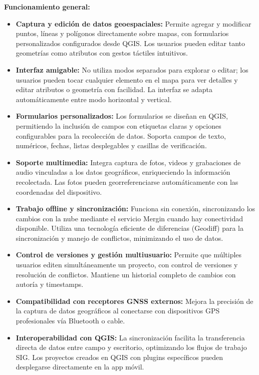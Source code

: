 \documentclass[12pt, a4paper]{book}
\begin{document}
\textbf{Funcionamiento general:}
\begin{itemize}
  \item \textbf{Captura y edición de datos geoespaciales:} Permite agregar y modificar puntos, líneas y polígonos directamente sobre mapas, con formularios personalizados configurados desde QGIS. Los usuarios pueden editar tanto geometrías como atributos con gestos táctiles intuitivos.
  
  \item \textbf{Interfaz amigable:} No utiliza modos separados para explorar o editar; los usuarios pueden tocar cualquier elemento en el mapa para ver detalles y editar atributos o geometría con facilidad. La interfaz se adapta automáticamente entre modo horizontal y vertical.
  
  \item \textbf{Formularios personalizados:} Los formularios se diseñan en QGIS, permitiendo la inclusión de campos con etiquetas claras y opciones configurables para la recolección de datos. Soporta campos de texto, numéricos, fechas, listas desplegables y casillas de verificación.
  
  \item \textbf{Soporte multimedia:} Integra captura de fotos, videos y grabaciones de audio vinculadas a los datos geográficos, enriqueciendo la información recolectada. Las fotos pueden georreferenciarse automáticamente con las coordenadas del dispositivo.
  
  \item \textbf{Trabajo offline y sincronización:} Funciona sin conexión, sincronizando los cambios con la nube mediante el servicio Mergin cuando hay conectividad disponible. Utiliza una tecnología eficiente de diferencias (Geodiff) para la sincronización y manejo de conflictos, minimizando el uso de datos.
  
  \item \textbf{Control de versiones y gestión multiusuario:} Permite que múltiples usuarios editen simultáneamente un proyecto, con control de versiones y resolución de conflictos. Mantiene un historial completo de cambios con autoría y timestamps.
  
  \item \textbf{Compatibilidad con receptores GNSS externos:} Mejora la precisión de la captura de datos geográficos al conectarse con dispositivos GPS profesionales vía Bluetooth o cable.
  
  \item \textbf{Interoperabilidad con QGIS:} La sincronización facilita la transferencia directa de datos entre campo y escritorio, optimizando los flujos de trabajo SIG. Los proyectos creados en QGIS con plugins específicos pueden desplegarse directamente en la app móvil.
\end{itemize}
\end{document}
